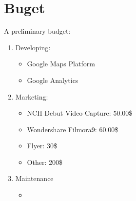 \documentclass[dvips,12pt]{article}
\begin{document}
\begin{center}
\end{center}





\section{Buget}
A preliminary budget: 
\begin{enumerate}
    \item Developing:
    \begin{itemize}
        \item Google Maps Platform
        \item Google Analytics
    \end{itemize}
    \item Marketing:
    \begin{itemize}
        \item NCH Debut Video Capture: 50.00\$
        \item Wondershare Filmora9: 60.00\$
        \item Flyer: 30\$
        \item Other: 200\$
    \end{itemize}
    \item Maintenance
    \begin{itemize}
        \item 
    \end{itemize}

\end{enumerate}
\end{document}
